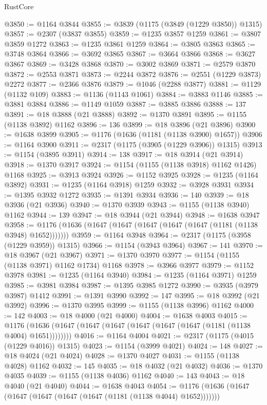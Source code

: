 \begin{lexlean}{RustCore}
\begin{coremodule}
@3850 := @1164 @3844
@3855 := @3839 (@1175 (@3849 (@1229 @3850)) @1315)
@3857 := @2307 (@3837 @3855)
@3859 := @1235 @3857 @1259
@3861 := @3807 @3859 @1272
@3863 := @1235 @3861 @1259
@3864 := @3805 @3863
@3865 := @3748 @3864
@3866 := @3692 @3865
@3867 := @3664 @3866
@3868 := @3627 @3867
@3869 := @3428 @3868
@3870 := @3002 @3869
@3871 := @2579 @3870
@3872 := @2553 @3871
@3873 := @2244 @3872
@3876 := @2551 (@1229 @3873) @2272
@3877 := @2366 @3876
@3879 := @1046 (@2288 @3877)
@3881 := @1129 (@1132 @109)
@3883 := @1136 (@1143 @1061)
@3884 := @3883 @1146
@3885 := @3881 @3884
@3886 := @1149 @1059
@3887 := @3885 @3886
@3888 := 137
@3891 := @18 @3888 (@21 @3888)
@3892 := @1370 @3891
@3895 := @1155 (@1138 @3892) @1162
@3896 := 136
@3899 := @18 @3896 (@21 @3896)
@3900 := @1638 @3899
@3905 := @1176 (@1636 (@1181 (@1138 @3900) @1657))
@3906 := @1164 @3900
@3911 := @2317 (@1175 (@3905 (@1229 @3906)) @1315)
@3913 := @1154 (@3895 @3911)
@3914 := 138
@3917 := @18 @3914 (@21 @3914)
@3918 := @1370 @3917
@3924 := @1154 (@1155 (@1138 @3918) @1162 @1426) @1168
@3925 := @3913 @3924
@3926 := @1152 @3925
@3928 := @1235 (@1164 @3892)
@3931 := @1235 (@1164 @3918) @1259
@3932 := @3928 @3931
@3934 := @1395 @3932 @1272
@3935 := @1391 @3934
@3936 := 140
@3939 := @18 @3936 (@21 @3936)
@3940 := @1370 @3939
@3943 := @1155 (@1138 @3940) @1162
@3944 := 139
@3947 := @18 @3944 (@21 @3944)
@3948 := @1638 @3947
@3958 := @1176 (@1636 (@1647 (@1647 (@1647 (@1647 (@1647 (@1181 (@1138 @3948) @1652)))))))
@3959 := @1164 @3948
@3964 := @2317 (@1175 (@3958 (@1229 @3959)) @1315)
@3966 := @1154 (@3943 @3964)
@3967 := 141
@3970 := @18 @3967 (@21 @3967)
@3971 := @1370 @3970
@3977 := @1154 (@1155 (@1138 @3971) @1162 @1734) @1168
@3978 := @3966 @3977
@3979 := @1152 @3978
@3981 := @1235 (@1164 @3940)
@3984 := @1235 (@1164 @3971) @1259
@3985 := @3981 @3984
@3987 := @1395 @3985 @1272
@3990 := @3935 (@3979 @3987) @1412
@3991 := @1391 @3990
@3992 := 147
@3995 := @18 @3992 (@21 @3992)
@3996 := @1370 @3995
@3999 := @1155 (@1138 @3996) @1162
@4000 := 142
@4003 := @18 @4000 (@21 @4000)
@4004 := @1638 @4003
@4015 := @1176 (@1636 (@1647 (@1647 (@1647 (@1647 (@1647 (@1647 (@1181 (@1138 @4004) @1651))))))))
@4016 := @1164 @4004
@4021 := @2317 (@1175 (@4015 (@1229 @4016)) @1315)
@4023 := @1154 (@3999 @4021)
@4024 := 148
@4027 := @18 @4024 (@21 @4024)
@4028 := @1370 @4027
@4031 := @1155 (@1138 @4028) @1162
@4032 := 145
@4035 := @18 @4032 (@21 @4032)
@4036 := @1370 @4035
@4039 := @1155 (@1138 @4036) @1162
@4040 := 143
@4043 := @18 @4040 (@21 @4040)
@4044 := @1638 @4043
@4054 := @1176 (@1636 (@1647 (@1647 (@1647 (@1647 (@1647 (@1181 (@1138 @4044) @1652)))))))

\end{coremodule}
\end{lexlean}
